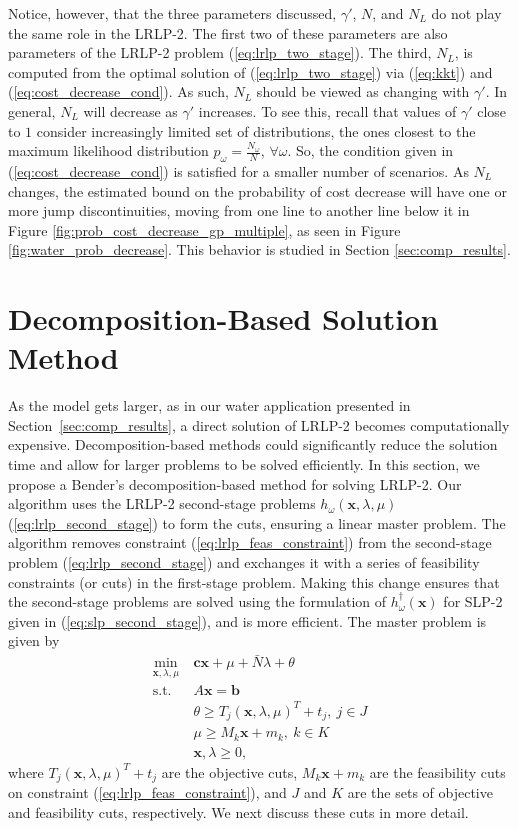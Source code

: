 \documentclass[11pt]{article}
\newcommand{\x}{\mathbf{x}}
\renewcommand{\c}{\mathbf{c}}
\renewcommand{\b}{\mathbf{b}}
\newcommand{\st}{\mbox{s.t.}}
\begin{document}
Notice, however, that the three parameters discussed, $\gamma'$, $N$, and $N_L$ do not play the same role in the LRLP-2.
The first two of these parameters are also parameters of the LRLP-2 problem (\ref{eq:lrlp_two_stage}).
The third, $N_L$, is computed from the optimal solution of (\ref{eq:lrlp_two_stage}) via (\ref{eq:kkt}) and (\ref{eq:cost_decrease_cond}).
As such, $N_L$ should be viewed as changing with $\gamma'$.
In general, $N_L$ will decrease as $\gamma'$ increases. To see this, recall that values of  $\gamma'$ close to $1$ consider increasingly limited set of distributions, the ones closest to the maximum likelihood distribution $p_\omega = \frac{N_\omega}{N}$, $\forall \omega$. So, the condition given in (\ref{eq:cost_decrease_cond}) is satisfied for a smaller number of scenarios. As $N_L$ changes, the estimated bound on the probability of cost decrease will have one or more jump discontinuities, moving from one line to another line below it in Figure \ref{fig:prob_cost_decrease_gp_multiple}, as seen in Figure \ref{fig:water_prob_decrease}.
This behavior is studied in Section \ref{sec:comp_results}.

\section{Decomposition-Based Solution Method} \label{sec:soln_algorithm}

As the model gets larger, as in our water application presented in Section~\ref{sec:comp_results}, a direct solution of LRLP-2 becomes computationally expensive. 
Decomposition-based methods could significantly reduce the solution time and allow for larger problems to be solved efficiently. In this section, we propose a Bender's decomposition-based method for solving LRLP-2.
Our algorithm uses the LRLP-2 second-stage problems $h_\omega(\x,\lambda,\mu)$ (\ref{eq:lrlp_second_stage}) to form the cuts, ensuring a linear master problem.
The algorithm removes constraint (\ref{eq:lrlp_feas_constraint}) from the second-stage problem (\ref{eq:lrlp_second_stage}) and exchanges it with a series of feasibility constraints (or cuts) in the first-stage problem.
Making this change ensures that the second-stage problems are solved using the formulation of $h^\dagger_\omega(\x)$ for SLP-2 given in  (\ref{eq:slp_second_stage}), and is more efficient.
The master problem is given by
\begin{align}
	\min_{\x,\lambda,\mu} \ & \c\x + \mu + \bar{N}\lambda + \theta \label{eq:master_problem}\\
	\st \ & A\x = \b \nonumber \\
	& \theta \geq T_j (\x,\lambda,\mu)^T + t_j, \ j \in J \nonumber \\
	& \mu \geq M_k \x + m_k, \ k \in K \nonumber \\
	& \x,\lambda \geq 0, \nonumber
\end{align}
where $T_j (\x,\lambda,\mu)^T + t_j$ are the objective cuts, $M_k \x + m_k$ are the feasibility cuts on constraint (\ref{eq:lrlp_feas_constraint}), and $J$ and $K$ are the sets of objective and feasibility cuts, respectively.
We next discuss these cuts in more detail.
\end{document}
